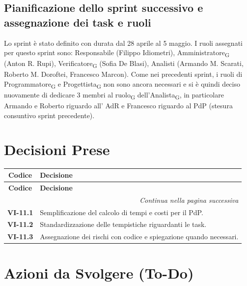 \subsection{Pianificazione dello sprint successivo e assegnazione dei task e ruoli}
Lo sprint è stato definito con durata dal 28 aprile al 5 maggio. I ruoli assegnati per questo sprint sono: 
Responsabile (Filippo Idiometri), Amministratore\textsubscript{G} (Anton R. Rupi), Verificatore\textsubscript{G} (Sofia De Blasi), 
Analisti (Armando M. Scarati, Roberto M. Doroftei, Francesco Marcon).
Come nei precedenti sprint, i ruoli di Programmatore\textsubscript{G} e Progettista\textsubscript{G} non sono ancora necessari e si è quindi 
deciso nuovamente di dedicare 3 membri al ruolo\textsubscript{G} dell'Analista\textsubscript{G}, in particolare Armando e Roberto riguardo all'
AdR e Francesco riguardo al PdP (stesura consuntivo sprint precedente).
\section{Decisioni Prese}

\renewcommand{\arraystretch}{1.3}
\vspace{-0.3cm}
\noindent
\begin{longtable}{c p{12cm}}
	\toprule
	\textbf{Codice} & \textbf{Decisione} \\
	\midrule
	\endfirsthead

	\toprule
	\textbf{Codice} & \textbf{Decisione} \\
	\midrule
	\endhead

	\midrule
	\multicolumn{2}{r}{\textit{Continua nella pagina successiva}} \\
	\midrule
	\endfoot

	\bottomrule
	\endlastfoot

	\textbf{VI-11.1} & {Semplificazione del calcolo di tempi e costi per il PdP.} \\
	\textbf{VI-11.2} & {Standardizzazione delle tempistiche riguardanti le task.} \\
	\textbf{VI-11.3} & {Assegnazione dei rischi con codice e spiegazione quando necessari.}

\end{longtable}

\section{Azioni da Svolgere (To-Do)}

